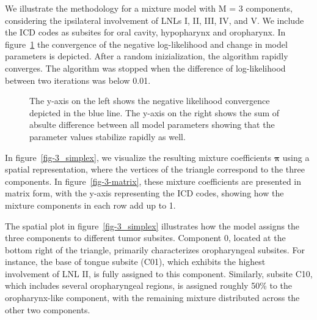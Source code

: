 \documentclass[
  sn-mathphys-num,
]{sn-jnl}
\begin{document}
We illustrate the methodology for a mixture model with M = 3 components,
considering the ipsilateral involvement of LNLs I, II, III, IV, and V.
We include the ICD codes as subsites for oral cavity, hypopharynx and
oropharynx. In figure~\ref{fig-convergence} the convergence of the
negative log-likelihood and change in model parameters is depicted.
After a random inizialization, the algorithm rapidly converges. The
algorithm was stopped when the difference of log-likelihood between two
iterations was below 0.01.

\begin{figure}


\caption{\label{fig-convergence}The y-axis on the left shows the
negative likelihood convergence depicted in the blue line. The y-axis on
the right shows the sum of absulte difference between all model
parameters showing that the parameter values stabilize rapidly as well.}

\end{figure}%

In figure~\ref{fig-3_simplex}, we visualize the resulting mixture
coefficients \(\boldsymbol{\pi}\) using a spatial representation, where
the vertices of the triangle correspond to the three components. In
figure~\ref{fig-3-matrix}, these mixture coefficients are presented in
matrix form, with the y-axis representing the ICD codes, showing how the
mixture components in each row add up to 1.

The spatial plot in figure~\ref{fig-3_simplex} illustrates how the model
assigns the three components to different tumor subsites. Component 0,
located at the bottom right of the triangle, primarily characterizes
oropharyngeal subsites. For instance, the base of tongue subsite (C01),
which exhibits the highest involvement of LNL II, is fully assigned to
this component. Similarly, subsite C10, which includes several
oropharyngeal regions, is assigned roughly 50\% to the oropharynx-like
component, with the remaining mixture distributed across the other two
components.
\end{document}
